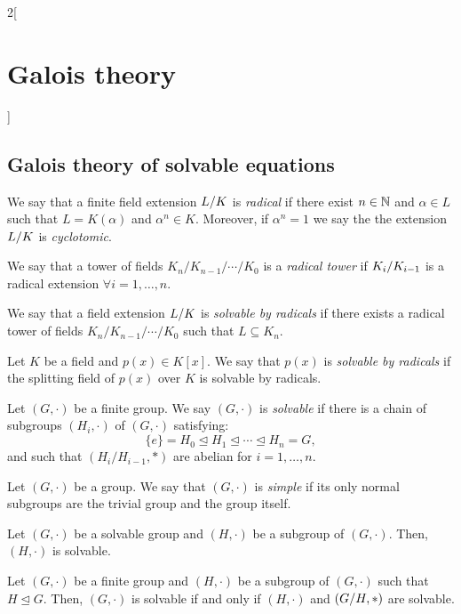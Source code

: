 \documentclass[../../../main.tex]{subfiles}
\begin{document}
\begin{multicols}{2}[\section{Galois theory}]
  \subsection{Galois theory of solvable equations}
  \begin{definition}
    We say that a finite field extension $\quot{L}{K}$ is \textit{radical} if there exist $n\in\mathbb{N}$ and $\alpha\in L$ such that $L=K(\alpha)$ and $\alpha^n\in K$. Moreover, if $\alpha^n=1$ we say the the extension $\quot{L}{K}$ is \textit{cyclotomic}.
  \end{definition}
  \begin{definition}
    We say that a tower of fields $K_n/K_{n-1}/\cdots/K_0$ is a \textit{radical tower} if $\quot{K_i}{K_{i-1}}$ is a radical extension $\forall i=1,\ldots,n$.
  \end{definition}
  \begin{definition}
    We say that a field extension $\quot{L}{K}$ is \textit{solvable by radicals} if there exists a radical tower of fields $K_n/K_{n-1}/\cdots/K_0$ such that $L\subseteq K_n$.
  \end{definition}
  \begin{definition}
    Let $K$ be a field and $p(x)\in K[x]$. We say that $p(x)$ is \textit{solvable by radicals} if the splitting field of $p(x)$ over $K$ is solvable by radicals.
  \end{definition}
  \begin{definition}
    Let $(G,\cdot)$ be a finite group. We say $(G,\cdot)$ is \textit{solvable} if there is a chain of subgroups $(H_i,\cdot)$ of $(G,\cdot)$ satisfying: $$\{e\}=H_0\unlhd H_1\unlhd\cdots\unlhd H_n=G,$$ and such that $(H_i/H_{i-1},*)$ are abelian for $i=1,\ldots,n$.
  \end{definition}
  \begin{definition}
    Let $(G,\cdot)$ be a group. We say that $(G,\cdot)$ is \textit{simple} if its only normal subgroups are the trivial group and the group itself.
  \end{definition}
  \begin{prop}
    Let $(G,\cdot)$ be a solvable group and $(H,\cdot)$ be a subgroup of $(G,\cdot)$. Then, $(H,\cdot)$ is solvable.
  \end{prop}
  \begin{prop}
    Let $(G,\cdot)$ be a finite group and $(H,\cdot)$ be a subgroup of $(G,\cdot)$ such that $H\unlhd G$. Then, $(G,\cdot)$ is solvable if and only if $(H,\cdot)$ and $(\quot{G}{H},*)$ are solvable.
  \end{prop}

\end{multicols}
\end{document}
